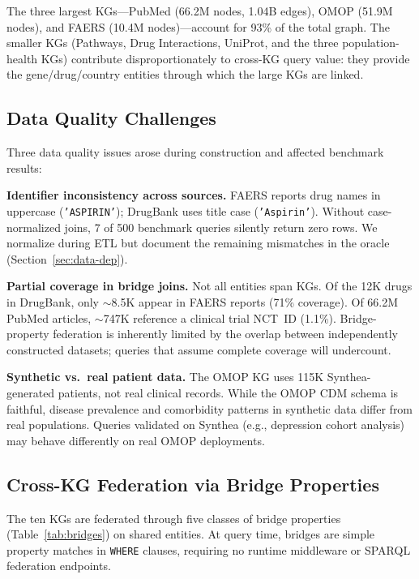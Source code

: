 \documentclass[runningheads]{llncs}
\begin{document}
The three largest KGs---PubMed (66.2M nodes, 1.04B edges), OMOP
(51.9M nodes), and FAERS (10.4M nodes)---account for 93\% of the
total graph.  The smaller KGs (Pathways, Drug Interactions,
UniProt, and the three population-health KGs) contribute
disproportionately to cross-KG query value: they provide the
gene/drug/country entities through which the large KGs are linked.

\subsection{Data Quality Challenges}

Three data quality issues arose during construction and affected
benchmark results:

\smallskip\noindent\textbf{Identifier inconsistency across sources.}
FAERS reports drug names in uppercase (\texttt{'ASPIRIN'});
DrugBank uses title case (\texttt{'Aspirin'}).  Without
case-normalized joins, 7 of 500 benchmark queries silently return
zero rows.  We normalize during ETL but document the remaining
mismatches in the oracle (Section~\ref{sec:data-dep}).

\smallskip\noindent\textbf{Partial coverage in bridge joins.}
Not all entities span KGs.  Of the 12K drugs in DrugBank, only
${\sim}$8.5K appear in FAERS reports (71\% coverage).  Of 66.2M
PubMed articles, ${\sim}$747K reference a clinical trial NCT~ID
(1.1\%).  Bridge-property federation is inherently limited by the
overlap between independently constructed datasets; queries that
assume complete coverage will undercount.

\smallskip\noindent\textbf{Synthetic vs.\ real patient data.}
The OMOP KG uses 115K Synthea-generated patients, not real clinical
records.  While the OMOP CDM schema is faithful, disease prevalence
and comorbidity patterns in synthetic data differ from real
populations.  Queries validated on Synthea (e.g., depression
cohort analysis) may behave differently on real OMOP deployments.

\subsection{Cross-KG Federation via Bridge Properties}\label{sec:federation}

The ten KGs are federated through five classes of bridge properties
(Table~\ref{tab:bridges}) on shared entities.  At query time,
bridges are simple property matches in \texttt{WHERE} clauses,
requiring no runtime middleware or SPARQL federation endpoints.
\end{document}
